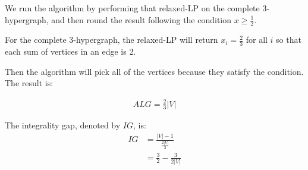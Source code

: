 We run the algorithm by performing that relaxed-LP on the complete 3-hypergraph, and then round the result following the condition $x \geq \frac{1}{2}$.

For the complete 3-hypergraph, the relaxed-LP will return $x_i = \frac{2}{3}$ for all $i$ so that each sum of vertices in an edge is 2.

Then the algorithm will pick all of the vertices because they satisfy the condition. The result is:

\begin{align*}
  ALG = \frac{2}{3}|V|
\end{align*}

The integrality gap, denoted by $IG$, is:
\begin{align*}
  IG &= \frac{|V| - 1}{\frac{2|V|}{3}} \\
  &= \frac{3}{2} - \frac{3}{2|V|}
\end{align*}
